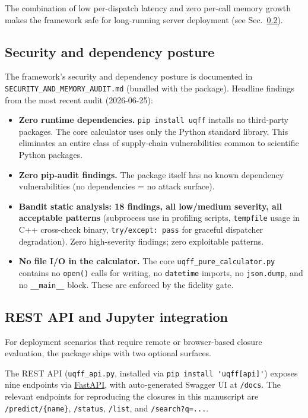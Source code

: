 The combination of low per-dispatch latency and zero per-call memory
growth makes the framework safe for long-running server deployment
(see Sec.~\ref{sec:rest_api}).

\subsection{Security and dependency posture}
\label{sec:security}

The framework's security and dependency posture is documented in
\texttt{SECURITY\_AND\_MEMORY\_AUDIT.md} (bundled with the package).
Headline findings from the most recent audit (2026-06-25):

\begin{itemize}
  \item \textbf{Zero runtime dependencies.} \texttt{pip install uqff}
        installs no third-party packages. The core calculator uses
        only the Python standard library. This eliminates an entire
        class of supply-chain vulnerabilities common to scientific
        Python packages.
  \item \textbf{Zero pip-audit findings.} The package itself has no
        known dependency vulnerabilities (no dependencies = no
        attack surface).
  \item \textbf{Bandit static analysis: 18 findings, all low/medium
        severity, all acceptable patterns} (subprocess use in profiling
        scripts, \texttt{tempfile} usage in C++ cross-check binary,
        \texttt{try/except: pass} for graceful dispatcher degradation).
        Zero high-severity findings; zero exploitable patterns.
  \item \textbf{No file I/O in the calculator.} The core
        \texttt{uqff\_pure\_calculator.py} contains no
        \texttt{open()} calls for writing, no \texttt{datetime}
        imports, no \texttt{json.dump}, and no \texttt{\_\_main\_\_}
        block. These are enforced by the fidelity gate.
\end{itemize}

\subsection{REST API and Jupyter integration}
\label{sec:rest_api}

For deployment scenarios that require remote or browser-based
closure evaluation, the package ships with two optional surfaces.

The REST API (\texttt{uqff\_api.py}, installed via
\verb|pip install 'uqff[api]'|) exposes nine endpoints via
\href{https://fastapi.tiangolo.com}{FastAPI}, with auto-generated
Swagger UI at \verb|/docs|. The relevant endpoints for reproducing
the closures in this manuscript are
\verb|/predict/{name}|, \verb|/status|, \verb|/list|, and
\verb|/search?q=...|.

